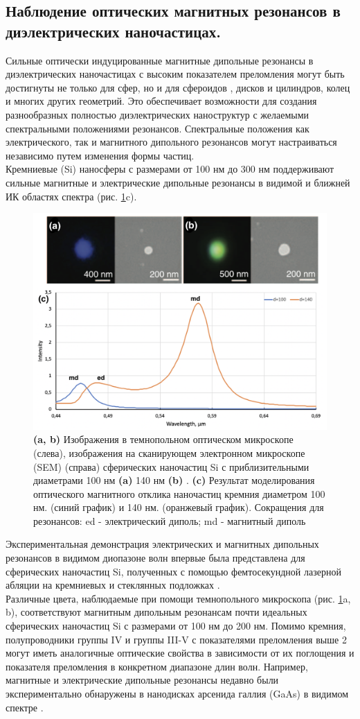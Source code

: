 \subsection*{Наблюдение оптических магнитных резонансов в диэлектрических наночастицах.}
\hspace*{2mm}
Сильные оптически индуцированные магнитные дипольные резонансы в диэлектрических наночастицах с высоким показателем преломления могут быть достигнуты не только для сфер, но и для сфероидов \cite{articleDirVi}, дисков и цилиндров, колец и многих других геометрий. Это обеспечивает возможности для создания разнообразных полностью диэлектрических наноструктур с желаемыми спектральными положениями резонансов. Спектральные положения как электрического, так и магнитного дипольного резонансов могут настраиваться независимо путем изменения формы частиц.
\\
\hspace*{2mm}
Кремниевые (Si) наносферы с размерами от 100 нм до 300 нм поддерживают сильные магнитные и электрические дипольные резонансы в видимой и ближней ИК областях спектра (рис. \ref{fig2}c). 
 \begin{figure}[h]
	\centering
	\includegraphics[width=0.5\linewidth]{images/graph1.png}
	\caption{\textbf{(a, b)} Изображения в темнопольном оптическом микроскопе (слева), изображения на сканирующем электронном микроскопе (SEM) (справа)  сферических наночастиц Si с приблизительными диаметрами 100 нм \textbf{(a)} 140 нм \textbf{(b)} \cite{kuznetsov2012luk}. \textbf{(c)} Результат моделирования оптического магнитного отклика наночастиц кремния  диаметром 100 нм. (синий график) и 140 нм. (оранжевый график).  Сокращения для резонансов: ed - электрический диполь; md - магнитный диполь}
	\label{fig2}
\end{figure}
Экспериментальная демонстрация электрических и магнитных дипольных резонансов в видимом диопазоне волн впервые была представлена для сферических наночастиц Si, полученных с помощью фемтосекундной лазерной абляции на кремниевых и стеклянных подложках \cite{kuznetsov2012luk}. 
\\
\hspace*{2mm}
Различные цвета, наблюдаемые при помощи темнопольного микроскопа (рис. \ref{fig2}a, b), соответствуют магнитным дипольным резонансам почти идеальных сферических наночастиц Si с размерами от 100 нм до 200 нм.  Помимо кремния, полупроводники группы IV и группы III-V с показателями преломления выше 2 могут иметь аналогичные оптические свойства в зависимости от их поглощения и показателя преломления в конкретном диапазоне длин волн. Например, магнитные и электрические дипольные резонансы недавно были экспериментально обнаружены в нанодисках арсенида галлия (GaAs) в видимом спектре \cite{person2013demonstration}.


